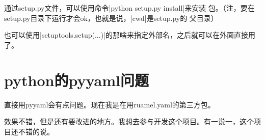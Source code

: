 通过setup.py文件，可以使用命令\vb|python setup.py install|来安装
包。（注，要在setup.py目录下运行才会ok，也就是说，\vb|cwd|是setup.py的
父目录）

也可以使用\vb|setuptools.setup(...)|的那啥来指定外部名，之后就可以在外面直接用了。


\section{python的pyyaml问题}

直接用pyyaml会有点问题。现在我是在用ruamel.yaml的第三方包。

效果不错，但是还有要改进的地方。我想去参与开发这个项目。有一说一，这个项目还不错的说。



